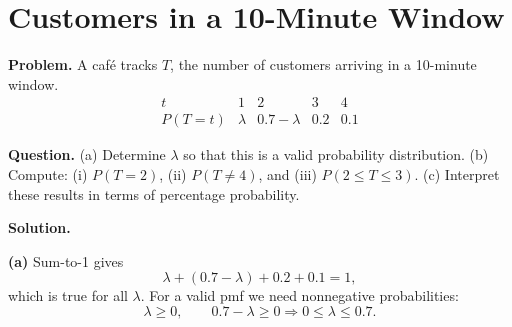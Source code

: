 		\section{Customers in a 10-Minute Window}
		
		\textbf{Problem.}
		A café tracks $T$, the number of customers arriving in a 10-minute window.
		\[
		\begin{array}{c|cccc}
			t & 1 & 2 & 3 & 4\\
			\hline
			P(T=t) & \lambda & 0.7-\lambda & 0.2 & 0.1
		\end{array}
		\]
		
		\textbf{Question.}
		(a) Determine $\lambda$ so that this is a valid probability distribution.
		(b) Compute: (i) $P(T=2)$, (ii) $P(T\ne 4)$, and (iii) $P(2\le T\le 3)$.
		(c) Interpret these results in terms of percentage probability.
		
		\textbf{Solution.}

		\textbf{(a)} Sum-to-1 gives
		\[
		\lambda+(0.7-\lambda)+0.2+0.1=1,
		\]
		which is true for all $\lambda$. For a valid pmf we need nonnegative probabilities:
		\[
		\lambda\ge 0,\qquad 0.7-\lambda\ge 0
		\Rightarrow 0\le \lambda\le 0.7.
		\]

